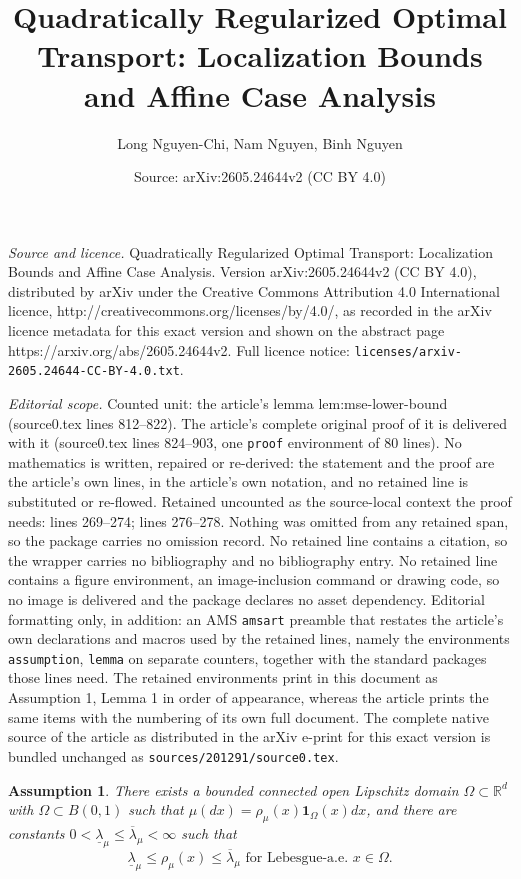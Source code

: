\documentclass[10pt,a4paper]{amsart}
\title{Quadratically Regularized Optimal Transport: Localization Bounds and Affine Case Analysis}
\author{Long Nguyen-Chi, Nam Nguyen, Binh Nguyen}
\date{Source: arXiv:2605.24644v2 (CC BY 4.0)}
\newtheorem{assumption}{Assumption}
\newcommand{\R}{\mathbb{R}}
\begin{document}
\maketitle

\noindent\emph{Source and licence.} Quadratically Regularized Optimal Transport: Localization Bounds and Affine Case Analysis. Version arXiv:2605.24644v2 (CC BY 4.0), distributed by arXiv under the Creative Commons Attribution 4.0 International licence, http://creativecommons.org/licenses/by/4.0/, as recorded in the arXiv licence metadata for this exact version and shown on the abstract page https://arxiv.org/abs/2605.24644v2. Full licence notice: \texttt{licenses/arxiv-2605.24644-CC-BY-4.0.txt}.\par\smallskip

\noindent\textit{Editorial scope.} Counted unit: the article's lemma lem:mse-lower-bound (source0.tex lines 812--822). The article's complete original proof of it is delivered with it (source0.tex lines 824--903, one \texttt{proof} environment of 80 lines). No mathematics is written, repaired or re-derived: the statement and the proof are the article's own lines, in the article's own notation, and no retained line is substituted or re-flowed.  Retained uncounted as the source-local context the proof needs: lines 269--274; lines 276--278.  Nothing was omitted from any retained span, so the package carries no omission record.  No retained line contains a citation, so the wrapper carries no bibliography and no bibliography entry.  No retained line contains a figure environment, an image-inclusion command or drawing code, so no image is delivered and the package declares no asset dependency.  Editorial formatting only, in addition: an AMS \texttt{amsart} preamble that restates the article's own declarations and macros used by the retained lines, namely the environments \texttt{assumption}, \texttt{lemma} on separate counters, together with the standard packages those lines need.  The retained environments print in this document as Assumption 1, Lemma 1 in order of appearance, whereas the article prints the same items with the numbering of its own full document.  The complete native source of the article as distributed in the arXiv e-print for this exact version is bundled unchanged as \texttt{sources/201291/source0.tex}.
\begin{assumption}\label{assu:mu}
There exists a bounded connected open Lipschitz domain $\Omega\subset\R^d$ with $\Omega\subset B(0,1)$ such that $\mu(dx)=\rho_\mu(x)\mathbf 1_{\Omega}(x)dx$, and there are constants $0<\underline\lambda_\mu\le\overline\lambda_\mu<\infty$ such that
$$
\underline\lambda_\mu\le\rho_\mu(x)\le\overline\lambda_\mu\text{ for Lebesgue-a.e. }x\in\Omega.
$$
\end{assumption}
\end{document}
